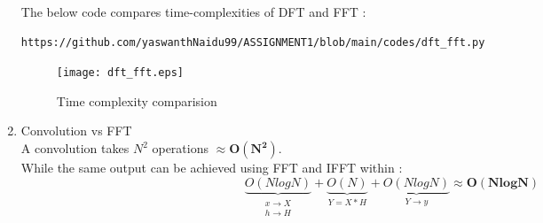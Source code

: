 \documentclass[journal,12pt,twocolumn]{IEEEtran}
\renewcommand\thesection{\arabic{section}}
\begin{document}
\begin{enumerate}[label=\thesection.\arabic*.,ref=\thesection.\theenumi]
The below code compares time-complexities of DFT and FFT  :\begin{lstlisting}
https://github.com/yaswanthNaidu99/ASSIGNMENT1/blob/main/codes/dft_fft.py
\end{lstlisting}
 
 \begin{figure}[!ht]
	\texttt{[image: dft\_fft.eps]}
	\caption{Time complexity comparision}
\end{figure}

\item Convolution vs FFT\\
A convolution takes $ N^{2}$ operations $\approx \boldsymbol{O(N^{2})}$.\\
While the same output can be achieved using FFT and IFFT within : 
\begin{equation}
   \underbrace{O(NlogN)}_{\substack{\text{$x \rightarrow X$} \\ {\text{$h \rightarrow H $}}  }} + 
   \underbrace{O(N)}_{\text{$Y = X*H$}} + 
   \underbrace{O(NlogN)}_{\text{$Y \rightarrow y$}} \approx \boldsymbol{O(NlogN)}
\end{equation}

\end{enumerate}
\end{document}
